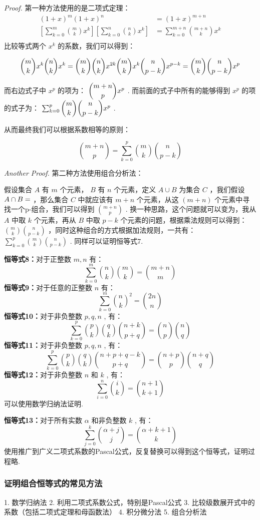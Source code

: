 \documentclass[cn, hazy, blue, normal, 12pt]{elegantnote}
\begin{document}
\textit{Proof.} 第一种方法使用的是二项式定理：
$$
    \begin{split}
        (1+x)^m(1+x)^n&=(1+x)^{m+n}\\
        \left[\sum_{k=0}^m\binom{m}{k}x^k\right]\left[\sum_{k=0}^n\binom{n}{k}x^k\right]&=\sum_{k=0}^{m+n}\binom{m+n}{k}x^k\\
    \end{split}
$$
比较等式两个 $ x^k $ 的系数，我们可以得到：

$$
    \binom{m}{k}x^k \binom{n}{k}x^k=\binom{m}{k}\binom{n}{k}x^{2k}\\
    \binom{m}{k}x^k \binom{n}{p-k}x^{p-k}=\binom{m}{k}\binom{n}{p-k}x^p
$$

而右边式子中 $ x^p $ 的项为： $ \dbinom{m+n}{p}x^p $ . 而前面的式子中所有的能够得到 $ x^p $ 的项的式子为： $ \sum_{k=0}^p\dbinom{m}{k}\dbinom{n}{p-k}x^p $ .

从而最终我们可以根据系数相等的原则：

$$
    \binom{m+n}{p}=\sum_{k=0}^p\binom{m}{k}\binom{n}{p-k}
$$

\textit{Another Proof.} 第二种方法使用组合分析法：

假设集合 $ A $ 有 $ m $ 个元素， $ B $ 有 $ n $ 个元素，定义 $ A\cup B $ 为集合 $ C $ ，我们假设 $ A\cap B=\empty $ ，那么集合 $ C $ 中就应该有 $ m+n $ 个元素，从这 $ (m+n) $ 个元素中寻找一个p-组合，我们可以得到 $ \binom{m+n}{p} $ . 换一种思路，这个问题就可以变为，我从 $ A $ 中取 $ k $ 个元素，再从 $ B $ 中取 $ p-k $ 个元素的问题，根据乘法规则可以得到： $ \binom{m}{k}\binom{n}{p-k} $ ，同时这种组合的方式根据加法规则，一共有： $ \sum_{k=0}^p\binom{m}{k}\binom{n}{p-k} $ . 同样可以证明恒等式7.

\textbf{恒等式8：}对于正整数 $ m,n $ 有：
$$
    \sum_{k=0}^m\binom{n}{k}\binom{m}{k}=\binom{m+n}{m}
$$
\textbf{恒等式9：}对于任意的正整数 $ n $ 有：
$$
    \sum_{k=0}^m\binom{n}{k}^2=\binom{2n}{n}
$$
\textbf{恒等式10：}对于非负整数 $ p,q,n $ , 有：
$$
    \sum_{k=0}^p\binom{p}{k}\binom{q}{k}\binom{n+k}{p+q}=\binom{n}{p}\binom{n}{q}
$$
\textbf{恒等式11：}对于非负整数 $ p,q,n $ , 有：
$$
    \sum_{k=0}^p\binom{p}{k}\binom{q}{k}\binom{n+p+q-k}{p+q}=\binom{n+p}{p}\binom{n+q}{q}
$$
\textbf{恒等式12：}对于非负整数 $ n $ 和 $ k $ , 有：
$$
    \sum_{i=0}^n\binom{i}{k}=\binom{n+1}{k+1}
$$
可以使用数学归纳法证明.

\textbf{恒等式13：}对于所有实数 $ \alpha $ 和非负整数 $ k $ , 有：
$$
    \sum_{j=0}^k\binom{\alpha+j}{j}=\binom{\alpha+k+1}{k}
$$
使用推广到广义二项式系数的Pascal公式，反复替换可以得到这个恒等式，证明过程略.

\subsubsection{证明组合恒等式的常见方法}

1. 数学归纳法
2. 利用二项式系数公式，特别是Pascal公式
3. 比较级数展开式中的系数（包括二项式定理和母函数法）
4. 积分微分法
5. 组合分析法
\end{document}
